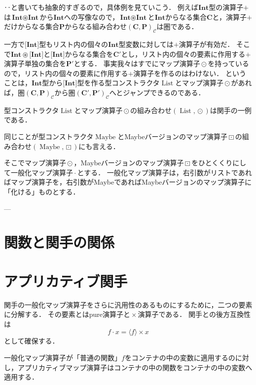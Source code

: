 \documentclass[twocolumn]{jsbook}
\newcommand{\hsklType}[1]{\textbf{#1}}
\newcommand{\hsklTypeConstructor}[1]{\mathop{\mathrm{#1}}}
\DeclareMathOperator{\hsklApplicativeMap}{\times}
\DeclareMathOperator{\hsklFmap}{\cdot}
\DeclareMathOperator{\hsklListConstructor}{\hsklTypeConstructor{List}}
\DeclareMathOperator{\hsklMap}{\odot}
\DeclareMathOperator{\hsklMaybeConstructor}{\hsklTypeConstructor{Maybe}}
\DeclareMathOperator{\hsklMaybeMap}{\boxdot}
\newcommand{\hsklInt}{\hsklType{Int}}
\newcommand{\hsklListType}[1]{\boldsymbol{[}#1\boldsymbol{]}}
\newcommand{\hsklPure}[1]{\langle#1\rangle}
\DeclareMathOperator{\mathSetTimes}{\circledast}
\newcommand{\mathSet}[1]{\mathbf{#1}}
\newcommand{\mathCategoryShort}[2]{(#1,#2)_\mathcal{C}}
\begin{document}
‥と書いても抽象的すぎるので，具体例を見ていこう．
例えば$\hsklInt$型の演算子$+$は$\hsklInt\mathSetTimes\hsklInt$から$\hsklInt$への写像なので，$\hsklInt\mathSetTimes\hsklInt$と$\hsklInt$からなる集合$\mathSet{C}$と，演算子$+$だけからなる集合$\mathSet{P}$からなる組み合わせ$\mathCategoryShort{\mathSet{C}}{\mathSet{P}}$は圏である．

一方で$\hsklListType{\hsklInt}$型もリスト内の個々の$\hsklInt$型変数に対しては$+$演算子が有効だ．
そこで$\hsklInt\mathSetTimes{}\hsklListType{\hsklInt}$と$\hsklListType{\hsklInt}$からなる集合を$\mathSet{C}'$とし，リスト内の個々の要素に作用する$+$演算子単独の集合を$\mathSet{P}'$とする．
事実我々はすでにマップ演算子$\hsklMap$を持っているので，リスト内の個々の要素に作用する$+$演算子を作るのはわけない．
ということは，$\hsklInt$型から$\hsklListType{\hsklInt}$型を作る型コンストラクタ$\hsklListConstructor$とマップ演算子$\hsklMap$があれば，圏$\mathCategoryShort{\mathSet{C}}{\mathSet{P}}$から圏$\mathCategoryShort{\mathSet{C}'}{\mathSet{P}'}$へとジャンプできるのである．

型コンストラクタ$\hsklListConstructor$とマップ演算子$\hsklMap$の組み合わせ$(\hsklListConstructor,\hsklMap)$は関手の一例である．

同じことが型コンストラクタ$\hsklMaybeConstructor$とMaybeバージョンのマップ演算子$\hsklMaybeMap$の組み合わせ$(\hsklMaybeConstructor,\hsklMaybeMap)$にも言える．

そこでマップ演算子$\hsklMap$，Maybeバージョンのマップ演算子$\hsklMaybeMap$をひとくくりにして一般化マップ演算子$\hsklFmap$とする．
一般化マップ演算子は，右引数がリストであればマップ演算子を，右引数がMaybeであればMaybeバージョンのマップ演算子に「化ける」ものとする．

---

\section{関数と関手の関係}


\section{アプリカティブ関手}

関手の一般化マップ演算子をさらに汎用性のあるものにするために，二つの要素に分解する．
その要素とはpure演算子と$\hsklApplicativeMap$演算子である．
関手との後方互換性は$$f\hsklFmap x=\hsklPure{f}\hsklApplicativeMap x$$として確保する．


一般化マップ演算子が「普通の関数」$f$をコンテナの中の変数に適用するのに対し，アプリカティブマップ演算子はコンテナの中の関数をコンテナの中の変数へ適用する．
\end{document}
